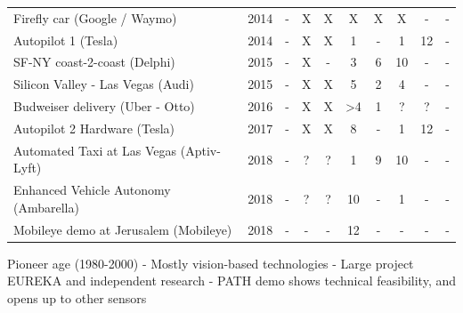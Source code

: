 \begin{table}[H]
\begin{tabularx}{\linewidth}{L r c c c c c c c c}
        Firefly car (Google / Waymo)                  & 2014  & - & X & X &  X &  X &  X &  - & - \\
        Autopilot 1   (Tesla)                         & 2014  & - & X & X &  1 &  - &  1 & 12 & - \\
        SF-NY coast-2-coast (Delphi)                  & 2015  & - & X & - &  3 &  6 & 10 &  - & - \\
        Silicon Valley - Las Vegas (Audi)             & 2015  & - & X & X &  5 
        &  2 &  4 &  - & - \\   
        Budweiser delivery (Uber - Otto)              & 2016  & - & X & X & >4 
        &  1 &  ? &  ? & - \\
        Autopilot 2 Hardware (Tesla)                  & 2017  & - & X & X &  8 
        &  - &  1 & 12 & - \\  
        Automated Taxi at Las Vegas (Aptiv-Lyft)      & 2018  & - & ? & ? &  1 
        &  9 & 10 &  - & - \\
        Enhanced Vehicle Autonomy (Ambarella)         & 2018  & - & ? & ? & 10 
        &  - &  1 &  - & - \\
        Mobileye demo at Jerusalem (Mobileye)         & 2018  & - & - & - & 12 
        &  - &  - &  - & - \\    
        
    \end{tabularx}
\end{table}


Pioneer age (1980-2000)
  - Mostly vision-based technologies
  - Large project EUREKA and independent research  
  - PATH demo shows technical feasibility, and opens up to other sensors
  
